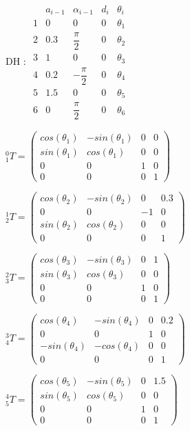 \documentclass[8pt]{article}
\begin{document}
\begin{list}{()~}{}
\item
DH :
$ \begin{array}{ccccc}
& a_{i-1} & \alpha_{i-1} & d_i & \theta_i \\
1& 0 & 0 & 0 & \theta_1 \\
2& 0.3 & \dfrac{\pi}{2} & 0 & \theta_2 \\
3& 1 & 0 & 0 & \theta_3 \\
4& 0.2 & - \dfrac{\pi}{2} & 0 & \theta_4 \\
5& 1.5 & 0 & 0 & \theta_5 \\
6& 0 & \dfrac{\pi}{2} & 0 & \theta_6
\end{array} $

$^0_1T = \left( \begin{array}{cccc}
cos(\theta_1) & -sin(\theta_1) & 0 & 0 \\
sin(\theta_1) & cos(\theta_1) & 0 & 0 \\
0 & 0 & 1 & 0 \\
0 & 0 & 0 & 1
\end{array} \right) $

$^1_2T = \left( \begin{array}{cccc}
cos(\theta_2) & -sin(\theta_2) & 0 & 0.3 \\
0 & 0 & -1 & 0 \\
sin(\theta_2) & cos(\theta_2) & 0 & 0 \\
0 & 0 & 0 & 1
\end{array} \right) $

$^2_3T = \left( \begin{array}{cccc}
cos(\theta_3) & -sin(\theta_3) & 0 & 1 \\
sin(\theta_3) & cos(\theta_3) & 0 & 0 \\
0 & 0 & 1 & 0 \\
0 & 0 & 0 & 1
\end{array} \right) $

$^3_4T = \left( \begin{array}{cccc}
cos(\theta_4) & -sin(\theta_4) & 0 & 0.2 \\
0 & 0 & 1 & 0 \\
-sin(\theta_4) & -cos(\theta_4) & 0 & 0 \\
0 & 0 & 0 & 1
\end{array} \right) $

$^4_5T = \left( \begin{array}{cccc}
cos(\theta_5) & -sin(\theta_5) & 0 & 1.5 \\
sin(\theta_5) & cos(\theta_5) & 0 & 0 \\
0 & 0 & 1 & 0 \\
0 & 0 & 0 & 1
\end{array} \right) $


\end{list}
\end{document}
